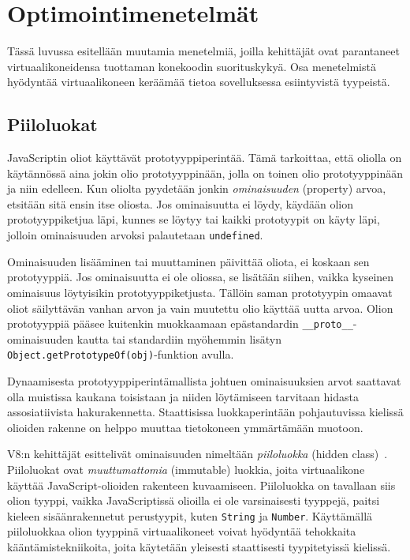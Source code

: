 \section{Optimointimenetelmät}

Tässä luvussa esitellään muutamia menetelmiä, joilla kehittäjät ovat parantaneet virtuaalikoneidensa tuottaman konekoodin suorituskykyä. Osa menetelmistä hyödyntää virtuaalikoneen keräämää tietoa sovelluksessa esiintyvistä tyypeistä.


\subsection{Piiloluokat}

JavaScriptin oliot käyttävät prototyyppiperintää. Tämä tarkoittaa, että oliolla on käytännössä aina jokin olio prototyyppinään, jolla on toinen olio prototyyppinään ja niin edelleen. Kun oliolta pyydetään jonkin \textit{ominaisuuden} (property) arvoa, etsitään sitä ensin itse oliosta. Jos ominaisuutta ei löydy, käydään olion prototyyppiketjua läpi, kunnes se löytyy tai kaikki prototyypit on käyty läpi, jolloin ominaisuuden arvoksi palautetaan \texttt{undefined}.

Ominaisuuden lisääminen tai muuttaminen päivittää oliota, ei koskaan sen prototyyppiä. Jos ominaisuutta ei ole oliossa, se lisätään siihen, vaikka kyseinen ominaisuus löytyisikin prototyyppiketjusta. Tällöin saman prototyypin omaavat oliot säilyttävän vanhan arvon ja vain muutettu olio käyttää uutta arvoa. Olion prototyyppiä pääsee kuitenkin muokkaamaan epästandardin \texttt{\_\_proto\_\_}-ominaisuuden kautta tai standardiin myöhemmin lisätyn \texttt{Object.getPrototypeOf(obj)}-funktion avulla.

Dynaamisesta prototyyppiperintämallista johtuen ominaisuuksien arvot saattavat olla muistissa kaukana toisistaan ja niiden löytämiseen tarvitaan hidasta assosiatiivista hakurakennetta. Staattisissa luokkaperintään pohjautuvissa kielissä olioiden rakenne on helppo muuttaa tietokoneen ymmärtämään muotoon.

V8:n kehittäjät esittelivät ominaisuuden nimeltään \textit{piiloluokka} (hidden class)~\cite{v8design}. Piiloluokat ovat \textit{muuttumattomia} (immutable) luokkia, joita virtuaalikone käyttää JavaScript-olioiden rakenteen kuvaamiseen. Piiloluokka on tavallaan siis olion tyyppi, vaikka JavaScriptissä olioilla ei ole varsinaisesti tyyppejä, paitsi kieleen sisäänrakennetut perustyypit, kuten \texttt{String} ja \texttt{Number}. Käyttämällä piiloluokkaa olion tyyppinä virtuaalikoneet voivat hyödyntää tehokkaita kääntämistekniikoita, joita käytetään yleisesti staattisesti tyypitetyissä kielissä.


